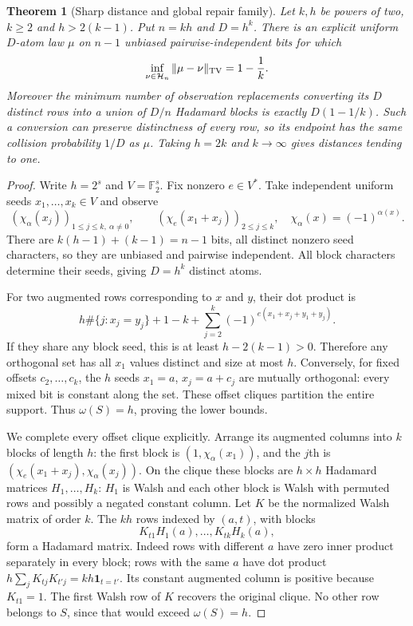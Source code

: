 \documentclass[11pt]{article}
\newtheorem{theorem}{Theorem}[section]
\begin{document}
\begin{theorem}[Sharp distance and global repair family]
\label{thm:design-sharp-distance}
Let $k,h$ be powers of two, $k\ge2$ and $h>2(k-1)$. Put
$n=kh$ and $D=h^k$. There is an explicit uniform $D$-atom law $\mu$
on $n-1$ unbiased pairwise-independent bits for which
\[
 \inf_{\nu\in\mathcal H_n}\|\mu-\nu\|_{\rm TV}=1-\frac1k.
\]
Moreover the minimum number of observation replacements converting
its $D$ distinct rows into a union of $D/n$ Hadamard blocks is exactly
$D(1-1/k)$. Such a conversion can preserve distinctness of every row,
so its endpoint has the same collision probability $1/D$ as $\mu$.
Taking $h=2k$ and $k\to\infty$ gives distances tending to one.
\end{theorem}
\begin{proof}
Write $h=2^s$ and $V=\mathbb F_2^s$. Fix nonzero $e\in V^*$.
Take independent uniform seeds $x_1,\ldots,x_k\in V$ and observe
\[
 (\chi_\alpha(x_j))_{1\le j\le k,\ \alpha\ne0},\qquad
 (\chi_e(x_1+x_j))_{2\le j\le k},
 \quad\chi_\alpha(x)=(-1)^{\alpha(x)}.
\]
There are $k(h-1)+(k-1)=n-1$ bits, all distinct nonzero seed
characters, so they are unbiased and pairwise independent. All block
characters determine their seeds, giving $D=h^k$ distinct atoms.

For two augmented rows corresponding to $x$ and $y$, their dot product is
\[
 h\#\{j:x_j=y_j\}+1-k+
 \sum_{j=2}^k(-1)^{e(x_1+x_j+y_1+y_j)}.
\]
If they share any block seed, this is at least $h-2(k-1)>0$.
Therefore any orthogonal set has all $x_1$ values distinct and size
at most $h$. Conversely, for fixed offsets $c_2,\ldots,c_k$, the $h$
seeds $x_1=a$, $x_j=a+c_j$ are mutually orthogonal: every mixed bit
is constant along the set. These offset cliques partition the entire
support. Thus $\omega(S)=h$, proving the lower bounds.

We complete every offset clique explicitly. Arrange its augmented
columns into $k$ blocks of length $h$: the first block is
$(1,\chi_\alpha(x_1))$, and the $j$th is
$(\chi_e(x_1+x_j),\chi_\alpha(x_j))$. On the clique these blocks
are $h\times h$ Hadamard matrices $H_1,\ldots,H_k$:
$H_1$ is Walsh and each other block is Walsh with permuted rows and
possibly a negated constant column. Let $K$ be the normalized Walsh
matrix of order $k$. The $kh$ rows indexed by $(a,t)$, with blocks
\[
 K_{t1}H_1(a),\ldots,K_{tk}H_k(a),
\]
form a Hadamard matrix. Indeed rows with different $a$ have zero inner
product separately in every block; rows with the same $a$ have dot
product $h\sum_jK_{tj}K_{t'j}=kh\mathbf1_{t=t'}$.
Its constant augmented column is positive because $K_{t1}=1$.
The first Walsh row of $K$ recovers the original clique. No other row
belongs to $S$, since that would exceed $\omega(S)=h$.


\end{proof}
\end{document}
